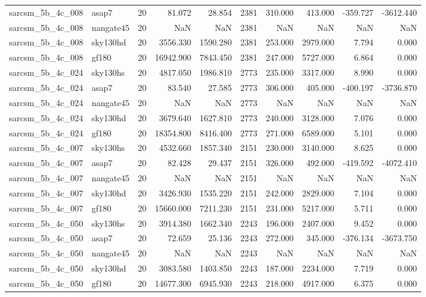 \documentclass{article}
\begin{document}
\begin{longtable}{llrrrrrrrr}
sarcsm\_5b\_4c\_008 & asap7 & 20 & 81.072 & 28.854 & 2381 & 310.000 & 413.000 & -359.727 & -3612.440 \\
sarcsm\_5b\_4c\_008 & nangate45 & 20 & NaN & NaN & 2381 & NaN & NaN & NaN & NaN \\
sarcsm\_5b\_4c\_008 & sky130hd & 20 & 3556.330 & 1590.280 & 2381 & 253.000 & 2979.000 & 7.794 & 0.000 \\
sarcsm\_5b\_4c\_008 & gf180 & 20 & 16942.900 & 7843.450 & 2381 & 247.000 & 5727.000 & 6.864 & 0.000 \\
sarcsm\_5b\_4c\_024 & sky130hs & 20 & 4817.050 & 1986.810 & 2773 & 235.000 & 3317.000 & 8.990 & 0.000 \\
sarcsm\_5b\_4c\_024 & asap7 & 20 & 83.540 & 27.585 & 2773 & 306.000 & 405.000 & -400.197 & -3736.870 \\
sarcsm\_5b\_4c\_024 & nangate45 & 20 & NaN & NaN & 2773 & NaN & NaN & NaN & NaN \\
sarcsm\_5b\_4c\_024 & sky130hd & 20 & 3679.640 & 1627.810 & 2773 & 240.000 & 3128.000 & 7.076 & 0.000 \\
sarcsm\_5b\_4c\_024 & gf180 & 20 & 18354.800 & 8416.400 & 2773 & 271.000 & 6589.000 & 5.101 & 0.000 \\
sarcsm\_5b\_4c\_007 & sky130hs & 20 & 4532.660 & 1857.340 & 2151 & 230.000 & 3140.000 & 8.625 & 0.000 \\
sarcsm\_5b\_4c\_007 & asap7 & 20 & 82.428 & 29.437 & 2151 & 326.000 & 492.000 & -419.592 & -4072.410 \\
sarcsm\_5b\_4c\_007 & nangate45 & 20 & NaN & NaN & 2151 & NaN & NaN & NaN & NaN \\
sarcsm\_5b\_4c\_007 & sky130hd & 20 & 3426.930 & 1535.220 & 2151 & 242.000 & 2829.000 & 7.104 & 0.000 \\
sarcsm\_5b\_4c\_007 & gf180 & 20 & 15660.000 & 7211.230 & 2151 & 231.000 & 5217.000 & 5.711 & 0.000 \\
sarcsm\_5b\_4c\_050 & sky130hs & 20 & 3914.380 & 1662.340 & 2243 & 196.000 & 2407.000 & 9.452 & 0.000 \\
sarcsm\_5b\_4c\_050 & asap7 & 20 & 72.659 & 25.136 & 2243 & 272.000 & 345.000 & -376.134 & -3673.750 \\
sarcsm\_5b\_4c\_050 & nangate45 & 20 & NaN & NaN & 2243 & NaN & NaN & NaN & NaN \\
sarcsm\_5b\_4c\_050 & sky130hd & 20 & 3083.580 & 1403.850 & 2243 & 187.000 & 2234.000 & 7.719 & 0.000 \\
sarcsm\_5b\_4c\_050 & gf180 & 20 & 14677.300 & 6945.930 & 2243 & 218.000 & 4917.000 & 6.375 & 0.000 \\

\end{longtable}
\end{document}
